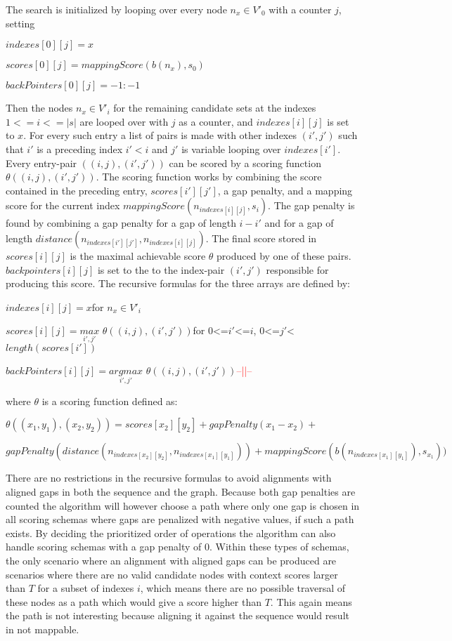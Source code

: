 \documentclass{article}
\begin{document}
The search is initialized by looping over every node $n_x \in V'_0$ with a counter $j$, setting\\
\par
$indexes[0][j] = x$\par
$scores[0][j] = mappingScore(b(n_x), s_0)$\par
$backPointers[0][j] = -1:-1$\\
\par\noindent
Then the nodes $n_x \in V'_i$ for the remaining candidate sets at the indexes $1<=i<=|s|$ are looped over with $j$ as a counter, and $indexes[i][j]$ is set to $x$. For every such entry a list of pairs is made with other indexes $(i', j')$ such that $i'$ is a preceding index $i'<i$ and $j'$ is variable looping over $indexes[i']$. Every entry-pair $((i, j), (i', j'))$ can be scored by a scoring function $\theta((i, j), (i', j'))$. The scoring function works by combining the score contained in the preceding entry, $scores[i'][j']$, a gap penalty, and a mapping score for the current index $mappingScore(n_{indexes[i][j]}, s_i)$. The gap penalty is found by combining a gap penalty for a gap of length $i-i'$ and for a gap of length $distance(n_{indexes[i'][j']}, n_{indexes[i][j]})$. The final score stored in $scores[i][j]$ is the maximal achievable score $\theta$ produced by one of these pairs. $backpointers[i][j]$ is set to the to the index-pair $(i', j')$ responsible for producing this score. The recursive formulas for the three arrays are defined by:\\
\par
$indexes[i][j] = x$\quad for $n_x \in V'_i$\par
$scores[i][j] = \underset{i', j'}{max}$ $\theta((i, j), (i', j'))$\quad for $0$<=$i'$<=$i$, $0$<=$j'$<$length(scores[i'])$\par
$backPointers[i][j] = \underset{i', j'}{arg max}$ $\theta((i, j), (i', j'))$\quad \textcolor{red}{--||--}\par
\par\noindent
where $\theta$ is a scoring function defined as:\\
\par
$\theta((x_1, y_1), (x_2, y_2))=scores[x_2][y_2] + gapPenalty(x_1-x_2) +$\par$ gapPenalty(distance(n_{indexes[x_2][y_2]}, n_{indexes[x_1][y_1]})) + mappingScore(b(n_{indexes[x_1][y_1]}), s_{x_1}))$
\par\noindent
There are no restrictions in the recursive formulas to avoid alignments with aligned gaps in both the sequence and the graph. Because both gap penalties are counted the algorithm will however choose a path where only one gap is chosen in all scoring schemas where gaps are penalized with negative values, if such a path exists. By deciding the prioritized order of operations the algorithm can also handle scoring schemas with a gap penalty of $0$. Within these types of schemas, the only scenario where an alignment with aligned gaps can be produced are scenarios where there are no valid candidate nodes with context scores larger than $T$ for a subset of indexes $i$, which means there are no possible traversal of these nodes as a path which would give a score higher than $T$. This again means the path is not interesting because aligning it against the sequence would result in not mappable.
\end{document}

